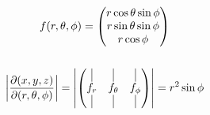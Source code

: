 \documentclass[00_complete]{subfiles}
\begin{document}
\begin{example}
   \begin{gather*}
       f(r,\theta,\phi) = \begin{pmatrix}
           r\cos\theta\sin\phi \\
           r\sin\theta\sin\phi \\
           r\cos\phi
       \end{pmatrix} \\ \\
       \left|\pdv{(x,y,z)}{(r,\theta,\phi)}\right|=\left|\begin{pmatrix}
           \vline & \vline & \vline \\
           f_r & f_\theta & f_\phi \\
           \vline & \vline & \vline
       \end{pmatrix} \right| = r^2\sin\phi
   \end{gather*}
\end{example}
\end{document}
